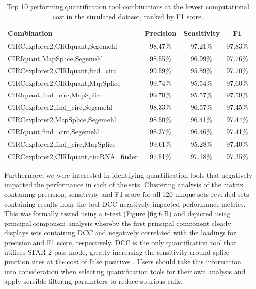 \documentclass{bmcart}
\begin{document}
\begin{table}[ht!]
\caption{Top 10 performing quantification tool combinations at the lowest computational cost in the simulated dataset, ranked by F1 score.}
\centering
\begin{tabular}{lccc}
  \toprule
\textbf{Combination} & \textbf{Precision} & \textbf{Sensitivity} & \textbf{F1} \\ 
  \midrule
CIRCexplorer2,CIRIquant,Segemehl & 98.47\% & 97.21\% & 97.83\% \\ 
  CIRIquant,MapSplice,Segemehl & 98.55\% & 96.99\% & 97.76\% \\ 
  CIRCexplorer2,CIRIquant,find\_circ & 99.59\% & 95.89\% & 97.70\% \\ 
  CIRCexplorer2,CIRIquant,MapSplice & 99.74\% & 95.54\% & 97.60\% \\ 
  CIRIquant,find\_circ,MapSplice & 99.70\% & 95.57\% & 97.59\% \\ 
  CIRCexplorer2,find\_circ,Segemehl & 98.33\% & 96.57\% & 97.45\% \\ 
  CIRCexplorer2,MapSplice,Segemehl & 98.50\% & 96.41\% & 97.44\% \\ 
  CIRIquant,find\_circ,Segemehl & 98.37\% & 96.46\% & 97.41\% \\ 
  CIRCexplorer2,find\_circ,MapSplice & 99.61\% & 95.28\% & 97.40\% \\ 
  CIRCexplorer2,CIRIquant,circRNA\_finder & 97.51\% & 97.18\% & 97.35\% \\ 
   \midrule
\end{tabular}
\label{table:topcombinations}
\end{table}

Furthermore, we were interested in identifying quantification tools that negatively impacted the performance in each of the sets. Clustering analysis of the matrix containing precision, sensitivity and F1 score for all 126 unique sets revealed sets containing results from the tool DCC negatively impacted performance metrics. This was formally tested using a t-test (Figure \ref{fig:6}B) and depicted using principal component analysis whereby the first principal component clearly displays sets containing DCC and negatively correlated with the loadings for precision and F1 score, respectively. DCC is the only quantification tool that utilises STAR 2-pass mode, greatly increasing the sensitivity around splice junction sites at the cost of false positives \cite{Engstrom2013}. Users should take this information into consideration when selecting quantification tools for their own analysis and apply sensible filtering parameters to reduce spurious calls. 
\end{document}
